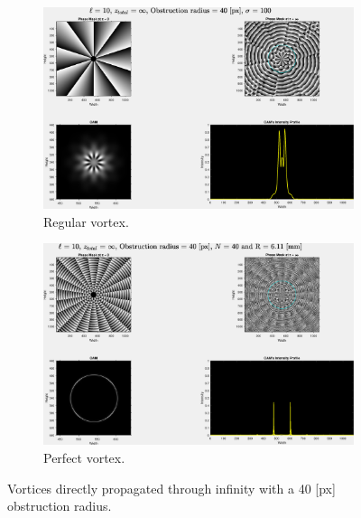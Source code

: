 \newpage
\begin{figure}[htbp]
    \centering
    \begin{subfigure}[b]{0.45\textwidth}
        \centering
        \includegraphics[width=\textwidth]{images/c04/type=0_r=40_zi=0_zf=Inf.eps}
        \caption{Regular vortex.}
    \end{subfigure}
    \hfill
    \begin{subfigure}[b]{0.45\textwidth}
        \centering
        \includegraphics[width=\textwidth]{images/c04/type=1_r=40_zi=0_zf=Inf.eps}
        \caption{Perfect vortex.}
    \end{subfigure}
    \caption{Vortices directly propagated through infinity with a 40 [px] obstruction radius.}
    \label{fig:Vortices_r=40_z=inf}
\end{figure}

